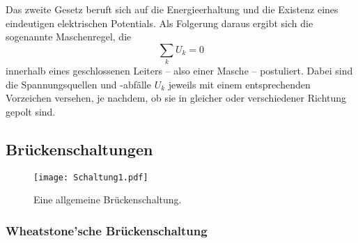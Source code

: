Das zweite Gesetz beruft sich auf die Energieerhaltung und die Existenz eines eindeutigen elektrischen Potentials. 
Als Folgerung daraus ergibt sich die sogenannte Maschenregel, die 
\begin{equation}
    \sum_k U_k=0
    \label{eqn:kirchhoff2}
\end{equation}
innerhalb eines geschlossenen Leiters -- also einer Masche -- postuliert. 
Dabei sind die Spannungsquellen und -abfälle $U_k$ jeweils mit einem entsprechenden Vorzeichen versehen, je nachdem, ob sie 
in gleicher oder verschiedener Richtung gepolt sind. 

\subsection{Brückenschaltungen}
\begin{figure}
    \centering
    \texttt{[image: Schaltung1.pdf]}
    \caption{Eine allgemeine Brückenschaltung.}
    \label{fig:allg_schalt}
\end{figure}

\subsubsection{Wheatstone'sche Brückenschaltung}